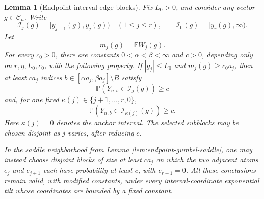 \documentclass[11pt]{article}
\newtheorem{lemma}[theorem]{Lemma}
\theoremstyle{remark}
\newcommand{\Pp}{\mathbb P}
\newcommand{\Ee}{\mathbb E}
\begin{document}
\begin{lemma}[Endpoint interval edge blocks]
\label{lem:endpoint-interval-edge-blocks}
Fix \(L_0>0\), and consider any vector \(g\in\mathscr C_n\).  Write
\[
        \mathcal I_j(g)=[y_{j-1}(g),y_j(g))\quad(1\le j\le r),
        \qquad
        \mathcal I_0(g)=[y_r(g),\infty).
\]
Let
\[
        m_j(g)=\Ee W_j(g).
\]
For every \(c_0>0\), there are constants
\(0<\alpha<\beta<\infty\) and \(c>0\), depending only on
\(r,\eta,L_0,c_0\), with the following property.  If
\(|g_j|\le L_0\) and \(m_j(g)\ge c_0a_j\), then at least \(ca_j\) indices
\(b\in[\alpha a_j,\beta a_j]\setminus B\) satisfy
\[
        \Pp(Y_{n,b}\in\mathcal I_j(g))\ge c
\]
and, for one fixed
\(\kappa(j)\in\{j+1,\ldots,r,0\}\),
\[
        \Pp(Y_{n,b}\in\mathcal I_{\kappa(j)}(g))\ge c.
\]
Here \(\kappa(j)=0\) denotes the anchor interval.
The selected subblocks may be chosen disjoint as \(j\) varies, after reducing
\(c\).

In the saddle neighborhood from Lemma
\ref{lem:endpoint-gumbel-saddle}, one may instead choose disjoint blocks of
size at least \(ca_j\) on which the two adjacent atoms \(e_j\) and
\(e_{j+1}\) each have probability at least \(c\), with
\(e_{r+1}=0\).  All these conclusions remain valid, with modified constants,
under every interval-coordinate exponential tilt whose coordinates are bounded
by a fixed constant.
\end{lemma}
\end{document}
